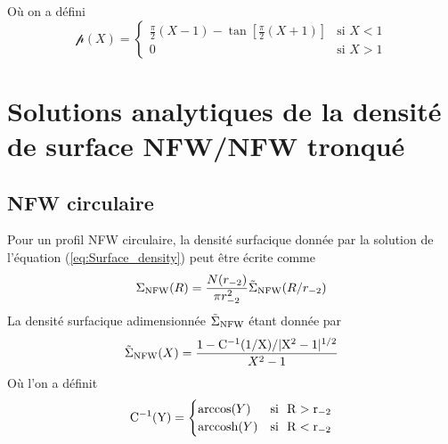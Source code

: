 \documentclass[a4paper,11pt]{article}
\numberwithin{equation}{section}
\DeclareMathOperator{\arccosh}{arccosh}  %
\begin{document}
  Où on a défini
  \begin{equation}
    \mathcal{p} (X) = 
    \begin{cases}
      \frac{\pi}{2} (X-1) - \tan \left [ \frac{\pi}{2} (X+1) \right ] & \mbox{si } X < 1 \\
      0 & \mbox{si } X > 1
    \end{cases}
  \end{equation}
    
\newpage

\newpage
\appendix   %
\section{Solutions analytiques de la densité de surface NFW/NFW tronqué}
  \subsection{NFW circulaire}
	  Pour un profil NFW circulaire, la densité surfacique donnée par la solution de l'équation (\ref{eq:Surface_density}) peut être écrite comme	
  	\begin{equation}
  	  \label{eq:NFW_tilde_tronque}
  		\Sigma_{\rm{NFW}} (R) = \frac{N(r_{-2})}{\pi r_{-2}^2} \tilde{\Sigma}_{\rm{NFW}} (R/r_{-2})
  	\end{equation}
  	La densité surfacique adimensionnée $\tilde{\Sigma}_{\rm{NFW}}$ étant donnée par\cite{Lokas2001}
    \begin{equation}
    	\tilde{\Sigma}_{\rm{NFW}} (X) =  \frac{1 - \rm{C}^{-1} (1/X)/ | X^2 -1 |^{1/2} }{X^2 -1}
    \end{equation}  
    Où l'on a définit
    \begin{equation}
    	\rm{C}^{-1}(Y) = 
    	\begin{cases}  	
    	 	\arccos(Y) & \rm{si} \ \ R>r_{-2}\\
   	  	\arccosh(Y) & \rm{si} \ \ R<r_{-2}
    	\end{cases}
    \end{equation}
  
\end{document}
